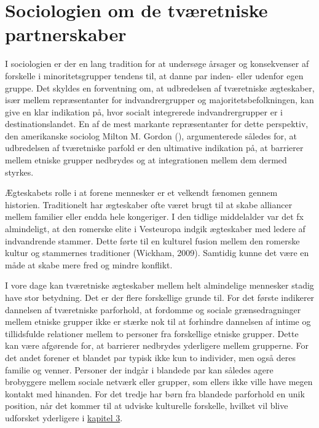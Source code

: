 \documentclass[
]{book}
\begin{document}
\section{Sociologien om de tværetniske partnerskaber}\label{sociologien-om-de-tvuxe6retniske-partnerskaber}

I sociologien er der en lang tradition for at undersøge årsager og konsekvenser af forskelle i minoritetsgrupper tendens til, at danne par inden- eller udenfor egen gruppe. Det skyldes en forventning om, at udbredelsen af tværetniske ægteskaber, især mellem repræsentanter for indvandrergrupper og majoritetsbefolkningen, kan give en klar indikation på, hvor socialt integrerede indvandrergrupper er i destinationslandet. En af de mest markante repræsentanter for dette perspektiv, den amerikanske sociolog Milton M. Gordon (), argumenterede således for, at udbredelsen af tværetniske parfold er den ultimative indikation på, at barrierer mellem etniske grupper nedbrydes og at integrationen mellem dem dermed styrkes.

Ægteskabets rolle i at forene mennesker er et velkendt fænomen gennem historien. Traditionelt har ægteskaber ofte været brugt til at skabe alliancer mellem familier eller endda hele kongeriger. I den tidlige middelalder var det fx almindeligt, at den romerske elite i Vesteuropa indgik ægteskaber med ledere af indvandrende stammer. Dette førte til en kulturel fusion mellem den romerske kultur og stammernes traditioner (Wickham, 2009). Samtidig kunne det være en måde at skabe mere fred og mindre konflikt.

I vore dage kan tværetniske ægteskaber mellem helt almindelige mennesker stadig have stor betydning. Det er der flere forskellige grunde til. For det første indikerer dannelsen af tværetniske parforhold, at fordomme og sociale grænsedragninger mellem etniske grupper ikke er stærke nok til at forhindre dannelsen af intime og tillidsfulde relationer mellem to personer fra forskellige etniske grupper. Dette kan være afgørende for, at barrierer nedbrydes yderligere mellem grupperne. For det andet forener et blandet par typisk ikke kun to individer, men også deres familie og venner. Personer der indgår i blandede par kan således agere brobyggere mellem sociale netværk eller grupper, som ellers ikke ville have megen kontakt med hinanden. For det tredje har børn fra blandede parforhold en unik position, når det kommer til at udviske kulturelle forskelle, hvilket vil blive udforsket yderligere i \hyperref[kap3]{kapitel 3}.
\end{document}
